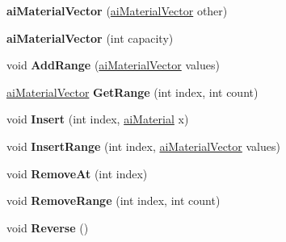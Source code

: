 \begin{DoxyCompactItemize}
\item 
\hypertarget{classai_material_vector_a661a59e105981b864576c8e91bcbc1e3}{{\bfseries ai\+Material\+Vector} (\hyperlink{classai_material_vector}{ai\+Material\+Vector} other)}\label{classai_material_vector_a661a59e105981b864576c8e91bcbc1e3}

\item 
\hypertarget{classai_material_vector_ac03912823a5e5ae2f453ba15be1910bf}{{\bfseries ai\+Material\+Vector} (int capacity)}\label{classai_material_vector_ac03912823a5e5ae2f453ba15be1910bf}

\item 
\hypertarget{classai_material_vector_a42389e97a16d77ad282a7747c2bceaf0}{void {\bfseries Add\+Range} (\hyperlink{classai_material_vector}{ai\+Material\+Vector} values)}\label{classai_material_vector_a42389e97a16d77ad282a7747c2bceaf0}

\item 
\hypertarget{classai_material_vector_a743582386d4c7bf6d528175d301c2f55}{\hyperlink{classai_material_vector}{ai\+Material\+Vector} {\bfseries Get\+Range} (int index, int count)}\label{classai_material_vector_a743582386d4c7bf6d528175d301c2f55}

\item 
\hypertarget{classai_material_vector_abf4ec57c6320fb44519a93ca70c9dc9d}{void {\bfseries Insert} (int index, \hyperlink{classai_material}{ai\+Material} x)}\label{classai_material_vector_abf4ec57c6320fb44519a93ca70c9dc9d}

\item 
\hypertarget{classai_material_vector_a45b9fff92ae48a87a85173f0ecf7ddbc}{void {\bfseries Insert\+Range} (int index, \hyperlink{classai_material_vector}{ai\+Material\+Vector} values)}\label{classai_material_vector_a45b9fff92ae48a87a85173f0ecf7ddbc}

\item 
\hypertarget{classai_material_vector_a5ea5ee4fd60b4e8b558f2a0898d2cc96}{void {\bfseries Remove\+At} (int index)}\label{classai_material_vector_a5ea5ee4fd60b4e8b558f2a0898d2cc96}

\item 
\hypertarget{classai_material_vector_a72b4d1a5ade18d67e35c6ed4d94f6511}{void {\bfseries Remove\+Range} (int index, int count)}\label{classai_material_vector_a72b4d1a5ade18d67e35c6ed4d94f6511}

\item 
\hypertarget{classai_material_vector_a7ae83fa58799f40803b28fa61e2c1cbc}{void {\bfseries Reverse} ()}\label{classai_material_vector_a7ae83fa58799f40803b28fa61e2c1cbc}


\end{DoxyCompactItemize}
